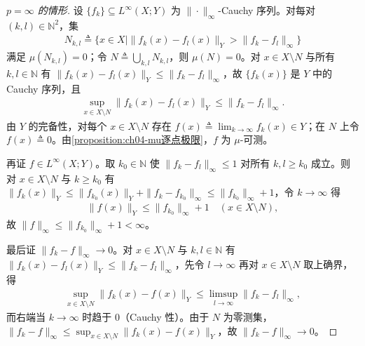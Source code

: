 \documentclass[../../main.tex]{subfiles}%
\begin{document}
\begin{proof}[$p=\infty$ 的情形]
设 $\{f_k\}\subseteq L^\infty(X;Y)$ 为 $\|\cdot\|_\infty$-Cauchy 序列。对每对 $(k,l)\in\mathbb{N}^2$，集
\begin{align*}
N_{k,l}\triangleq \{x\in X\mid\|f_k(x)-f_l(x)\|_Y>\|f_k-f_l\|_\infty\}
\end{align*}
满足 $\mu(N_{k,l})=0$；令 $N\triangleq \bigcup_{k,l}N_{k,l}$，则 $\mu(N)=0$。对 $x\in X\setminus N$ 与所有 $k,l\in\mathbb{N}$ 有 $\|f_k(x)-f_l(x)\|_Y\leqslant\|f_k-f_l\|_\infty$，故 $\{f_k(x)\}$ 是 $Y$ 中的 Cauchy 序列，且
\begin{align*}
\sup_{x\in X\setminus N}\|f_k(x)-f_l(x)\|_Y\leqslant\|f_k-f_l\|_\infty .
\end{align*}
由 $Y$ 的完备性，对每个 $x\in X\setminus N$ 存在 $f(x)\triangleq\lim_{k\to\infty}f_k(x)\in Y$；在 $N$ 上令 $f(x)\triangleq0$。由\cref{proposition:ch04-mu逐点极限}，$f$ 为 $\mu$-可测。

再证 $f\in L^\infty(X;Y)$。取 $k_0\in\mathbb{N}$ 使 $\|f_k-f_l\|_\infty\leqslant1$ 对所有 $k,l\geqslant k_0$ 成立。则对 $x\in X\setminus N$ 与 $k\geqslant k_0$ 有 $\|f_k(x)\|_Y\leqslant\|f_{k_0}(x)\|_Y+\|f_k-f_{k_0}\|_\infty\leqslant\|f_{k_0}\|_\infty+1$，令 $k\to\infty$ 得
\begin{align*}
\|f(x)\|_Y\leqslant\|f_{k_0}\|_\infty+1\quad(x\in X\setminus N),
\end{align*}
故 $\|f\|_\infty\leqslant\|f_{k_0}\|_\infty+1<\infty$。

最后证 $\|f_k-f\|_\infty\to0$。对 $x\in X\setminus N$ 与 $k,l\in\mathbb{N}$ 有 $\|f_k(x)-f_l(x)\|_Y\leqslant\|f_k-f_l\|_\infty$，先令 $l\to\infty$ 再对 $x\in X\setminus N$ 取上确界，得
\begin{align*}
\sup_{x\in X\setminus N}\|f_k(x)-f(x)\|_Y\leqslant\limsup_{l\to\infty}\|f_k-f_l\|_\infty,
\end{align*}
而右端当 $k\to\infty$ 时趋于 $0$（Cauchy 性）。由于 $N$ 为零测集，$\|f_k-f\|_\infty\leqslant\sup_{x\in X\setminus N}\|f_k(x)-f(x)\|_Y$，故 $\|f_k-f\|_\infty\to0$。
\end{proof}
\end{document}
